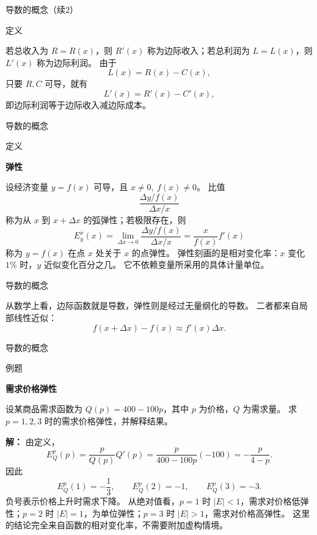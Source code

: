\documentclass[aspectratio=169,10pt,fontset=fandol]{ctexbeamer}
\begin{document}
\begin{frame}[t,fragile]{导数的概念（续2）}
\normalsize
\begin{block}{定义}
{\normalsize
若总收入为 $R=R(x)$，则 $R'(x)$ 称为边际收入；若总利润为 $L=L(x)$，则 $L'(x)$ 称为边际利润。 由于
\[
L(x)=R(x)-C(x),
\]
只要 $R,C$ 可导，就有
\[
L'(x)=R'(x)-C'(x),
\]
即边际利润等于边际收入减边际成本。

}
\end{block}
\end{frame}
\begin{frame}[t,fragile]{导数的概念}
\normalsize
\begin{block}{定义}
{\normalsize
\textbf{弹性}\par

设经济变量 $y=f(x)$ 可导，且 $x\neq0,\ f(x)\neq0$。 比值
\[
\frac{\Delta y/f(x)}{\Delta x/x}
\]
称为从 $x$ 到 $x+\Delta x$ 的弧弹性；若极限存在，则
\[
E_y^x(x)=\lim_{\Delta x\to0}\frac{\Delta y/f(x)}{\Delta x/x}
=\frac{x}{f(x)}f'(x)
\]
称为 $y=f(x)$ 在点 $x$ 处关于 $x$ 的点弹性。 弹性刻画的是相对变化率：$x$ 变化 $1\%$ 时，$y$ 近似变化百分之几。 它不依赖变量所采用的具体计量单位。

}
\end{block}
\end{frame}
\begin{frame}[t,fragile]{导数的概念}
\normalsize
{\normalsize
从数学上看，边际函数就是导数，弹性则是经过无量纲化的导数。 二者都来自局部线性近似：
\[
f(x+\Delta x)-f(x)\approx f'(x)\Delta x.
\]


}
\end{frame}
\begin{frame}[t,fragile]{导数的概念}
\normalsize
\begin{block}{例题}
{\normalsize
\textbf{需求价格弹性}\par

设某商品需求函数为 $Q(p)=400-100p$，其中 $p$ 为价格，$Q$ 为需求量。 求 $p=1,2,3$ 时的需求价格弹性，并解释结果。

}
\end{block}
\pause
{\normalsize
\textbf{解：}
由定义，
\[
E_Q^p(p)=\frac{p}{Q(p)}Q'(p)=\frac{p}{400-100p}(-100)=-\frac{p}{4-p}.
\]
因此
\[
E_Q^p(1)=-\frac13,\qquad E_Q^p(2)=-1,\qquad E_Q^p(3)=-3.
\]
负号表示价格上升时需求下降。 从绝对值看，$p=1$ 时 $|E|<1$，需求对价格低弹性；$p=2$ 时 $|E|=1$，为单位弹性；$p=3$ 时 $|E|>1$，需求对价格高弹性。 这里的结论完全来自函数的相对变化率，不需要附加虚构情境。

}
\end{frame}
\end{document}
